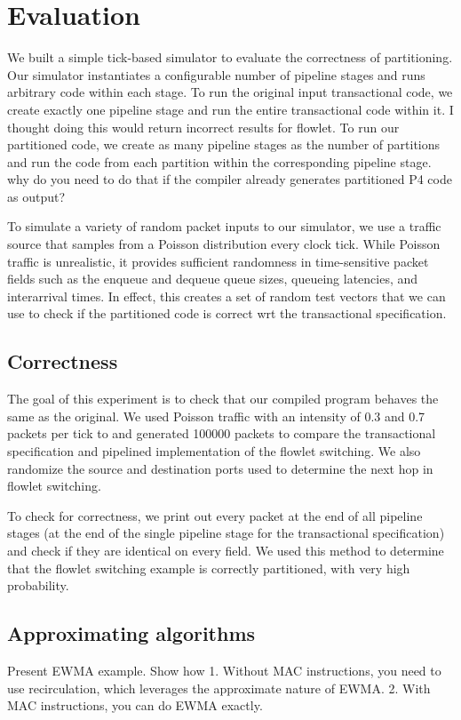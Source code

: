 \section{Evaluation}
\label{s:evaluation}

We built a simple tick-based simulator to evaluate the correctness of
partitioning. Our simulator instantiates a configurable number of pipeline
stages and runs arbitrary code within each stage. To run the
original input transactional code, we create exactly one pipeline stage and run
the entire transactional code within it. \ac{I thought doing this would return 
incorrect results for flowlet.} To run our partitioned code, we create
as many pipeline stages as the number of partitions and run the code from each
partition within the corresponding pipeline stage. \ac{why do you need to do 
that if the compiler already generates partitioned P4 code as output?}

To simulate a variety of random packet inputs to our simulator, we use a
traffic source that samples from a Poisson distribution every clock tick.
While Poisson traffic is unrealistic, it provides sufficient randomness in
time-sensitive packet fields such as the enqueue and dequeue queue sizes,
queueing latencies, and interarrival times. In effect, this creates a set of
random test vectors that we can use to check if the partitioned code is correct
wrt the transactional specification.

\subsection{Correctness}
\label{ss:correctness}

The goal of this experiment is to check that our compiled \pktlanguage program
behaves the same as the original. 
We used Poisson traffic with an intensity of 0.3 and 0.7 packets per tick to
and generated 100000 packets to compare the transactional specification and
pipelined implementation of the flowlet switching. We also randomize the source
and destination ports used to determine the next hop in flowlet switching.

To check for correctness, we print out every packet at the end of all pipeline
stages (at the end of the single pipeline stage for the transactional
specification) and check if they are identical on every field. We used this
method to determine that the flowlet switching example is correctly
partitioned, with very high probability.

\subsection{Approximating algorithms}
Present EWMA example. Show how
1. Without MAC instructions, you need to use recirculation, which leverages the approximate nature of EWMA.
2. With MAC instructions, you can do EWMA exactly.

